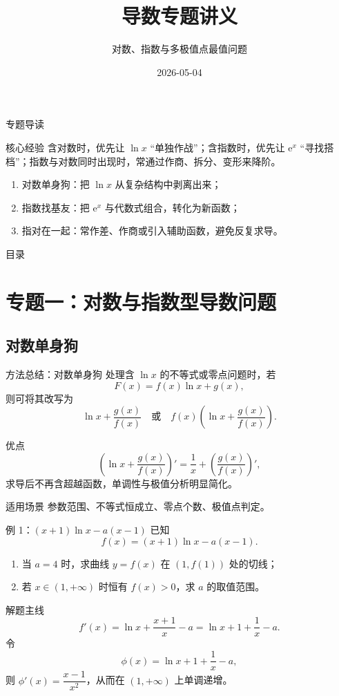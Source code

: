 ﻿\documentclass[aspectratio=169,11pt]{ctexbeamer}
\title{导数专题讲义}
\subtitle{对数、指数与多极值点最值问题}
\author{}
\date{2026-05-04}
\newcommand{\e}{\mathrm{e}}
\begin{document}
\begin{frame}
  \titlepage
\end{frame}

\begin{frame}{专题导读}
\small
\begin{block}{核心经验}
含对数时，优先让 $\ln x$ ``单独作战''；含指数时，优先让 $\e^x$ ``寻找搭档''；指数与对数同时出现时，常通过\alert{作商、拆分、变形}来降阶。
\end{block}

\begin{enumerate}
  \item 对数单身狗：把 $\ln x$ 从复杂结构中剥离出来；
  \item 指数找基友：把 $\e^x$ 与代数式组合，转化为新函数；
  \item 指对在一起：常作差、作商或引入辅助函数，避免反复求导。
\end{enumerate}
\end{frame}

\begin{frame}{目录}
  \tableofcontents[sectionstyle=show/shaded,subsectionstyle=show/show/hide]
\end{frame}

\section{专题一：对数与指数型导数问题}
\subsection{对数单身狗}

\begin{frame}{方法总结：对数单身狗}
\small
处理含 $\ln x$ 的不等式或零点问题时，若
\[
F(x)=f(x)\ln x+g(x),
\]
则可将其改写为
\[
\ln x+\frac{g(x)}{f(x)} \quad \text{或} \quad f(x)\left(\ln x+\frac{g(x)}{f(x)}\right).
\]

\begin{block}{优点}
\[
\left(\ln x+\frac{g(x)}{f(x)}\right)'=\frac1x+\left(\frac{g(x)}{f(x)}\right)',
\]
求导后不再含超越函数，单调性与极值分析明显简化。
\end{block}

\begin{alertblock}{适用场景}
参数范围、不等式恒成立、零点个数、极值点判定。
\end{alertblock}
\end{frame}

\begin{frame}{例 1：$(x+1)\ln x-a(x-1)$}
\small
已知
\[
f(x)=(x+1)\ln x-a(x-1).
\]
\begin{enumerate}
  \item 当 $a=4$ 时，求曲线 $y=f(x)$ 在 $(1,f(1))$ 处的切线；
  \item 若 $x\in(1,+\infty)$ 时恒有 $f(x)>0$，求 $a$ 的取值范围。
\end{enumerate}

\pause
\begin{block}{解题主线}
\[
f'(x)=\ln x+\frac{x+1}{x}-a=\ln x+1+\frac1x-a.
\]
令
\[
\phi(x)=\ln x+1+\frac1x-a,
\]
则 $\phi'(x)=\dfrac{x-1}{x^2}$，从而在 $(1,+\infty)$ 上单调递增。
\end{block}
\end{frame}
\end{document}
